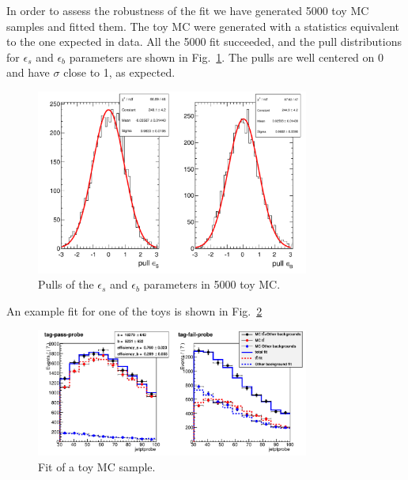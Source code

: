 In order to assess the robustness of the fit we have generated 5000 toy MC samples and fitted them. The toy MC were generated with a statistics equivalent to the one expected in data. All the 5000 fit succeeded, and the pull distributions for $\epsilon_{s}$ and $\epsilon_{b}$ parameters are shown in Fig.~\ref{fig:pullstp}. The pulls are well centered on 0 and have $\sigma$ close to 1, as expected.
\begin{figure}[t]
\centering
\includegraphics[width=0.8\textwidth]{images/pulls_mc.pdf}
\caption{Pulls of the $\epsilon_{s}$ and $\epsilon_{b}$ parameters in 5000 toy MC.\label{fig:pullstp}}
\end{figure}
An example fit for one of the toys is shown in  Fig.~\ref{fig:toy_tp}
\begin{figure}[b]
\centering
\includegraphics[width=0.8\textwidth]{images/mc_pt_probe_toy.pdf}
\caption{Fit of a toy MC sample.\label{fig:toy_tp}}
\end{figure}


